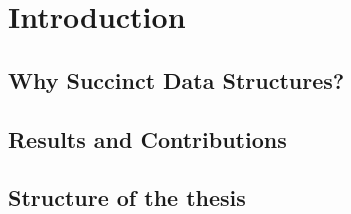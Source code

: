 
\chapter{Introduction} %

\label{ch:introduction} %

\section{Why Succinct Data Structures?}

\section{Results and Contributions}




\section{Structure of the thesis}


